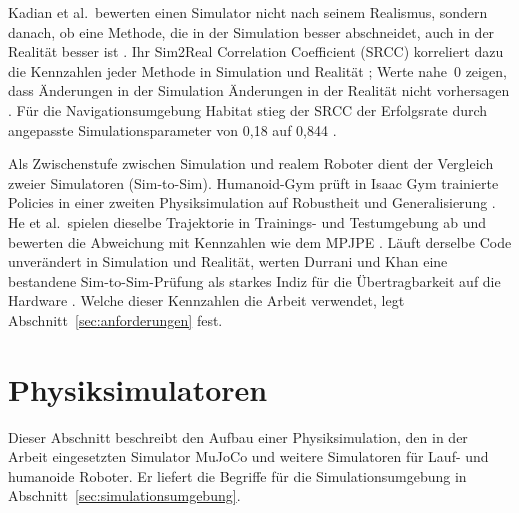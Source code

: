 Kadian et al.\ bewerten einen Simulator nicht nach seinem Realismus, sondern danach, ob eine Methode, die in der Simulation besser abschneidet, auch in der Realität besser ist \cite{Kadian2020}.
Ihr Sim2Real Correlation Coefficient (SRCC) korreliert dazu die Kennzahlen jeder Methode in Simulation und Realität \cite{Kadian2020}; Werte nahe~0 zeigen, dass Änderungen in der Simulation Änderungen in der Realität nicht vorhersagen \cite{Kadian2020}.
Für die Navigationsumgebung Habitat stieg der SRCC der Erfolgsrate durch angepasste Simulationsparameter von 0,18 auf 0,844 \cite{Kadian2020}.

Als Zwischenstufe zwischen Simulation und realem Roboter dient der Vergleich zweier Simulatoren (Sim-to-Sim).
Humanoid-Gym prüft in Isaac Gym trainierte Policies in einer zweiten Physiksimulation auf Robustheit und Generalisierung \cite{Gu2024}.
He et al.\ spielen dieselbe Trajektorie in Trainings- und Testumgebung ab und bewerten die Abweichung mit Kennzahlen wie dem MPJPE \cite{He2025}.
Läuft derselbe Code unverändert in Simulation und Realität, werten Durrani und Khan eine bestandene Sim-to-Sim-Prüfung als starkes Indiz für die Übertragbarkeit auf die Hardware \cite{Durrani2026}.
Welche dieser Kennzahlen die Arbeit verwendet, legt Abschnitt~\ref{sec:anforderungen} fest.

\section{Physiksimulatoren}
\label{sec:physiksimulatoren}
Dieser Abschnitt beschreibt den Aufbau einer Physiksimulation, den in der Arbeit eingesetzten Simulator MuJoCo und weitere Simulatoren für Lauf- und humanoide Roboter.
Er liefert die Begriffe für die Simulationsumgebung in Abschnitt~\ref{sec:simulationsumgebung}.

